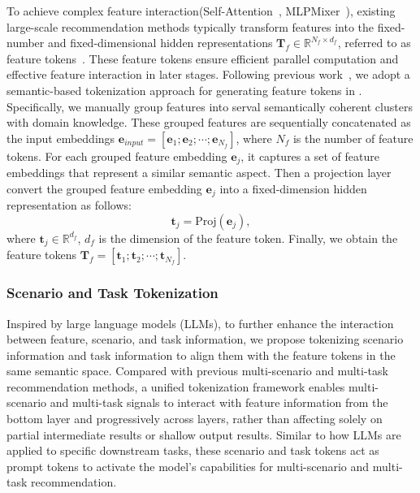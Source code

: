 To achieve complex feature interaction(\eg Self-Attention~\cite{transformer}, MLPMixer~\cite{MLPMixer}), existing large-scale recommendation methods typically transform features into the fixed-number and fixed-dimensional hidden representations $\bm{T}_{f} \in \mathbb{R}^{N_{f} \times d_{f}}$, referred to as feature tokens~\cite{RankMixer,OneTrans,KGBRank}. 
These feature tokens ensure efficient parallel computation and effective feature interaction in later stages.
Following previous work~\cite{RankMixer}, we adopt a semantic-based tokenization approach for generating feature tokens in \modelname.
Specifically, we manually group features into serval semantically coherent clusters with domain knowledge.
These grouped features are sequentially concatenated as the input embeddings $\bm{e}_{input} = [\bm{e}_1; \bm{e}_2; \cdots; \bm{e}_{N_{f}}]$, where $N_{f}$ is the number of feature tokens.
For each grouped feature embedding $\bm{e}_j$, it captures a set of feature embeddings that represent a similar semantic aspect.
Then a projection layer convert the grouped feature embedding $\bm{e}_j$ into a fixed-dimension hidden representation as follows:
\begin{equation}
    \bm{t}_{j} = \text{Proj}(\bm{e}_{j}),
\end{equation}
where $\bm{t}_{j} \in \mathbb{R}^{d_{f}}$, $d_{f}$ is the dimension of the feature token.
Finally, we obtain the feature tokens $\bm{T}_{f} = [\bm{t}_{1};\bm{t}_2;\cdots;\bm{t}_{N_{f}}]$.

\subsubsection{Scenario and Task Tokenization}
Inspired by large language models (LLMs), to further enhance the interaction between feature, scenario,  and task information, we propose tokenizing scenario information and task information to align them with the feature tokens in the same semantic space.
Compared with previous multi-scenario and multi-task recommendation methods, a unified tokenization framework enables multi-scenario and multi-task signals to interact with feature information from the bottom layer and progressively across layers, rather than affecting solely on partial intermediate results or shallow output results.
Similar to how LLMs are applied to specific downstream tasks, these scenario and task tokens act as prompt tokens to activate the model's capabilities for multi-scenario and multi-task recommendation.

